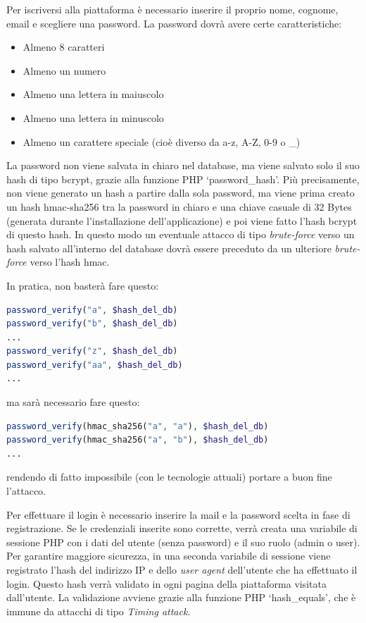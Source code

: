 \documentclass[italian,12pt,a4paper,oneside,final]{report}
\begin{document}
Per iscriversi alla piattaforma è necessario inserire il proprio nome, cognome, email e scegliere una password.
La password dovrà avere certe caratteristiche:
\begin{itemize}
	\item Almeno 8 caratteri
	\item Almeno un numero
	\item Almeno una lettera in maiuscolo
	\item Almeno una lettera in minuscolo
	\item Almeno un carattere speciale (cioè diverso da a-z, A-Z, 0-9 o \_)
\end{itemize}
La password non viene salvata in chiaro nel database, ma viene salvato solo il suo hash di tipo bcrypt, grazie alla funzione PHP `password\_hash'.
Più precisamente, non viene generato un hash a partire dalla sola password, ma viene prima creato un hash hmac-sha256 tra la password in chiaro e una chiave casuale di 32 Bytes (generata durante l'installazione dell'applicazione) e poi viene fatto l'hash bcrypt di questo hash.
In questo modo un eventuale attacco di tipo \textit{brute-force} verso un hash salvato all'interno del database dovrà essere preceduto da un ulteriore \textit{brute-force} verso l'hash hmac.

\noindent In pratica, non basterà fare questo:
\begin{lstlisting}[language=php]
password_verify("a", $hash_del_db)
password_verify("b", $hash_del_db)
...
password_verify("z", $hash_del_db)
password_verify("aa", $hash_del_db)
...
\end{lstlisting}
ma sarà necessario fare questo:
\begin{lstlisting}[language=php]
password_verify(hmac_sha256("a", "a"), $hash_del_db)
password_verify(hmac_sha256("a", "b"), $hash_del_db)
...
\end{lstlisting}
rendendo di fatto impossibile (con le tecnologie attuali) portare a buon fine l'attacco.

Per effettuare il login è necessario inserire la mail e la password scelta in fase di registrazione.
Se le credenziali inserite sono corrette, verrà creata una variabile di sessione PHP con i dati del utente (senza password) e il suo ruolo (admin o user).
Per garantire maggiore sicurezza, in una seconda variabile di sessione viene registrato l'hash del indirizzo IP e dello \textit{user agent} dell'utente che ha effettuato il login.
Questo hash verrà validato in ogni pagina della piattaforma visitata dall'utente.
La validazione avviene grazie alla funzione PHP `hash\_equals', che è immune da attacchi di tipo \textit{Timing attack}.
\end{document}
